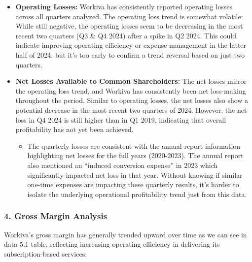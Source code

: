 \documentclass[
  10pt,
  a4paper,
]{article}
\providecommand{\tightlist}{%
  \setlength{\itemsep}{0pt}\setlength{\parskip}{0pt}}\usepackage{longtable,booktabs,array}
\begin{document}
\begin{itemize}
\tightlist
\item
  \textbf{Operating Losses:} Workiva has consistently reported operating
  losses across all quarters analyzed. The operating loss trend is
  somewhat volatile: While still negative, the operating losses seem to
  be decreasing in the most recent two quarters (Q3 \& Q4 2024) after a
  spike in Q2 2024. This could indicate improving operating efficiency
  or expense management in the latter half of 2024, but it's too early
  to confirm a trend reversal based on just two quarters.
\item
  \textbf{Net Losses Available to Common Shareholders:} The net losses
  mirror the operating loss trend, and Workiva has consistently been net
  loss-making throughout the period. Similar to operating losses, the
  net losses also show a potential decrease in the most recent two
  quarters of 2024. However, the net loss in Q4 2024 is still higher
  than in Q1 2019, indicating that overall profitability has not yet
  been achieved.

  \begin{itemize}
  \tightlist
  \item
    The quarterly losses are consistent with the annual report
    information highlighting net losses for the full years (2020-2023).
    The annual report also mentioned an ``induced conversion expense''
    in 2023 which significantly impacted net loss in that year. Without
    knowing if similar one-time expenses are impacting these quarterly
    results, it's harder to isolate the underlying operational
    profitability trend just from this data.
  \end{itemize}
\end{itemize}

\subsubsection{4. Gross Margin Analysis}\label{gross-margin-analysis}

Workiva's gross margin has generally trended upward over time as we can
see in data 5.1 table, reflecting increasing operating efficiency in
delivering its subscription-based services:
\end{document}
